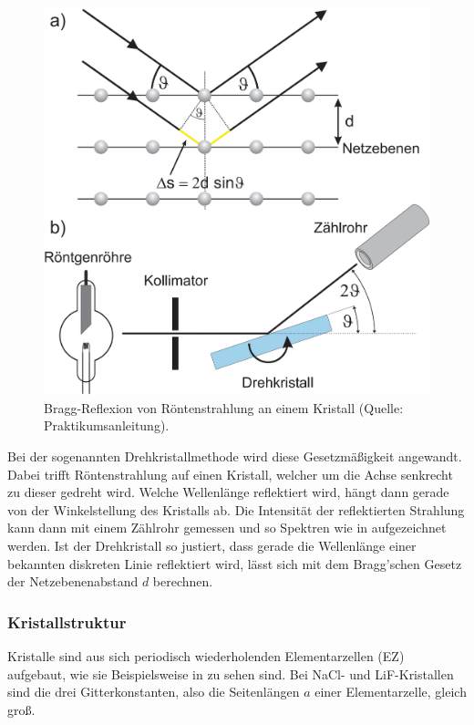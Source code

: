 \begin{figure}[H]
  \centering
  \includegraphics[width=.9\textwidth,trim={2cm 14cm 0.5cm 0},clip]{files/bragg_reflexion_drehkristall.png}
  \caption{Bragg-Reflexion von Röntenstrahlung an einem Kristall (Quelle: Praktikumsanleitung).}
  \label{fig:bragg_reflexion_drehkristall_a}
\end{figure}

Bei der sogenannten Drehkristallmethode wird diese Gesetzmäßigkeit angewandt. Dabei trifft Röntenstrahlung auf einen Kristall, welcher um die Achse senkrecht zu dieser gedreht wird. Welche Wellenlänge reflektiert wird, hängt dann gerade von der Winkelstellung des Kristalls ab. Die Intensität der reflektierten Strahlung kann dann mit einem Zählrohr gemessen und so Spektren wie in  aufgezeichnet werden. Ist der Drehkristall so justiert, dass gerade die Wellenlänge einer bekannten diskreten Linie reflektiert wird, lässt sich mit dem Bragg'schen Gesetz der Netzebenenabstand $d$ berechnen.

\subsubsection*{Kristallstruktur}

Kristalle sind aus sich periodisch wiederholenden Elementarzellen (EZ) aufgebaut, wie sie Beispielsweise in  zu sehen sind. Bei NaCl- und LiF-Kristallen sind die drei Gitterkonstanten, also die Seitenlängen $a$ einer Elementarzelle, gleich groß.

